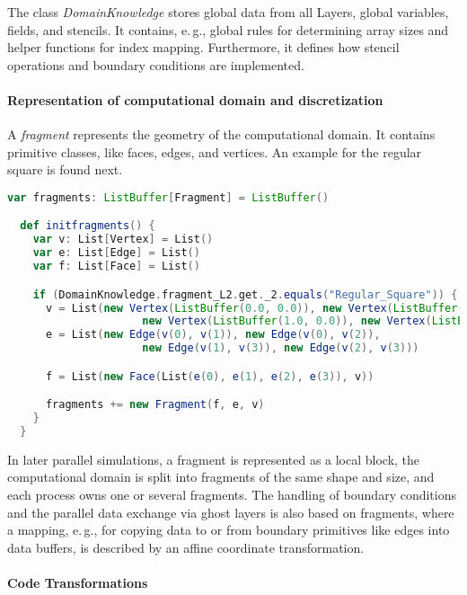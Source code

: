 \documentclass[onecolumn]{svjour3}
\begin{document}
The class \textit{DomainKnowledge} stores global data from all Layers, global variables, fields, and stencils. It contains, e.\,g., global rules for determining array sizes and helper functions for index mapping. Furthermore, it defines how stencil operations and boundary conditions are implemented. 

\paragraph{Representation of computational domain and discretization}

A \textit{fragment} represents the geometry of the computational domain. It contains primitive classes, like faces, edges, and vertices. An example for the regular square is found next. 
          
\begin{minipage}{\textwidth}
\begin{lstlisting}[language=Scala]
  var fragments: ListBuffer[Fragment] = ListBuffer()

  def initfragments() {
    var v: List[Vertex] = List()
    var e: List[Edge] = List()
    var f: List[Face] = List()

    if (DomainKnowledge.fragment_L2.get._2.equals("Regular_Square")) {
      v = List(new Vertex(ListBuffer(0.0, 0.0)), new Vertex(ListBuffer(0.0, 1.0)), 
			         new Vertex(ListBuffer(1.0, 0.0)), new Vertex(ListBuffer(1.0, 1.0)))
      e = List(new Edge(v(0), v(1)), new Edge(v(0), v(2)), 
			         new Edge(v(1), v(3)), new Edge(v(2), v(3)))

      f = List(new Face(List(e(0), e(1), e(2), e(3)), v))

      fragments += new Fragment(f, e, v)
    }
  }
\end{lstlisting}
\end{minipage}

In later parallel simulations, a fragment is represented as a local block, the computational domain is split into fragments of the same shape and size, and each process owns one or several fragments.
The handling of boundary conditions and the parallel data exchange via ghost layers is also based on fragments, where a mapping, e.\,g., for copying data to or from boundary primitives like edges into data buffers, is described by an affine coordinate transformation.



\paragraph{Code Transformations}
\end{document}
